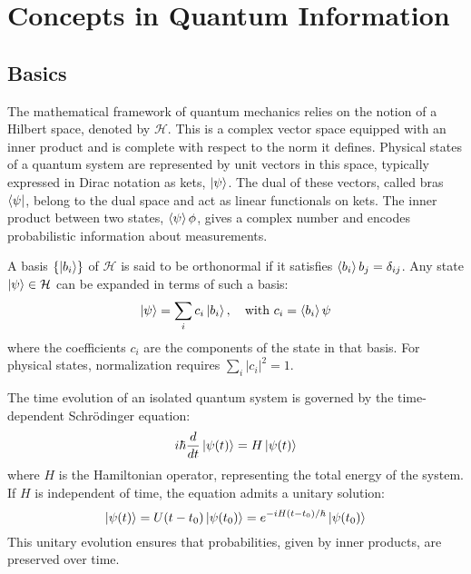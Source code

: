 \chapter{Concepts in Quantum Information}
\section{Basics}
The mathematical framework of quantum mechanics relies on the notion of a Hilbert space, denoted by $\mathcal{H}$. This is a complex vector space equipped with an inner product and is complete with respect to the norm it defines. Physical states of a quantum system are represented by unit vectors in this space, typically expressed in Dirac notation as kets, $\ket{\psi}$. The dual of these vectors, called bras $\bra{\psi}$, belong to the dual space and act as linear functionals on kets. The inner product between two states, $\braket{\psi}{\phi}$, gives a complex number and encodes probabilistic information about measurements.

A basis $\{\ket{b_i}\}$ of $\mathcal{H}$ is said to be orthonormal if it satisfies $\braket{b_i}{b_j} = \delta_{ij}$. Any state $\ket{\psi} \in \mathcal{H}$ can be expanded in terms of such a basis:
\begin{equation}
    \ket{\psi} = \sum_i c_i \ket{b_i}, \quad \text{with } c_i = \braket{b_i}{\psi}
\end{equation}
where the coefficients $c_i$ are the components of the state in that basis. For physical states, normalization requires $\sum_i |c_i|^2 = 1$.

The time evolution of an isolated quantum system is governed by the time-dependent Schrödinger equation:
\begin{equation}
    i\hbar \frac{d}{dt} \ket{\psi(t)} = H \ket{\psi(t)}
\end{equation}
where $H$ is the Hamiltonian operator, representing the total energy of the system. If $H$ is independent of time, the equation admits a unitary solution:
\begin{equation}
    \ket{\psi(t)} = U(t - t_0)\ket{\psi(t_0)} = e^{-iH(t - t_0)/\hbar} \ket{\psi(t_0)}
\end{equation}
This unitary evolution ensures that probabilities, given by inner products, are preserved over time.
